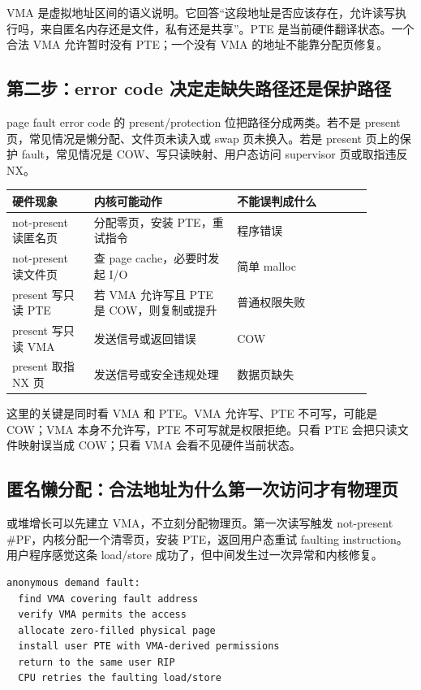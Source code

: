 VMA 是虚拟地址区间的语义说明。它回答“这段地址是否应该存在，允许读写执行吗，来自匿名内存还是文件，私有还是共享”。PTE 是当前硬件翻译状态。一个合法 VMA 允许暂时没有 PTE；一个没有 VMA 的地址不能靠分配页修复。

\subsection{第二步：error code 决定走缺失路径还是保护路径}

page fault error code 的 present/protection 位把路径分成两类。若不是 present 页，常见情况是懒分配、文件页未读入或 swap 页未换入。若是 present 页上的保护 fault，常见情况是 COW、写只读映射、用户态访问 supervisor 页或取指违反 NX。

\begin{longtable}{|p{0.20\linewidth}|p{0.35\linewidth}|p{0.33\linewidth}|}
\toprule
硬件现象 & 内核可能动作 & 不能误判成什么 \\
\midrule
not-present 读匿名页 & 分配零页，安装 PTE，重试指令 & 程序错误 \\\tablerowrule
not-present 读文件页 & 查 page cache，必要时发起 I/O & 简单 malloc \\\tablerowrule
present 写只读 PTE & 若 VMA 允许写且 PTE 是 COW，则复制或提升 & 普通权限失败 \\\tablerowrule
present 写只读 VMA & 发送信号或返回错误 & COW \\\tablerowrule
present 取指 NX 页 & 发送信号或安全违规处理 & 数据页缺失 \\
\bottomrule
\end{longtable}

这里的关键是同时看 VMA 和 PTE。VMA 允许写、PTE 不可写，可能是 COW；VMA 本身不允许写，PTE 不可写就是权限拒绝。只看 PTE 会把只读文件映射误当成 COW；只看 VMA 会看不见硬件当前状态。

\subsection{匿名懒分配：合法地址为什么第一次访问才有物理页}

 或堆增长可以先建立 VMA，不立刻分配物理页。第一次读写触发 not-present \#PF，内核分配一个清零页，安装 PTE，返回用户态重试 faulting instruction。用户程序感觉这条 load/store 成功了，但中间发生过一次异常和内核修复。

\begin{lstlisting}
anonymous demand fault:
  find VMA covering fault address
  verify VMA permits the access
  allocate zero-filled physical page
  install user PTE with VMA-derived permissions
  return to the same user RIP
  CPU retries the faulting load/store
\end{lstlisting}

